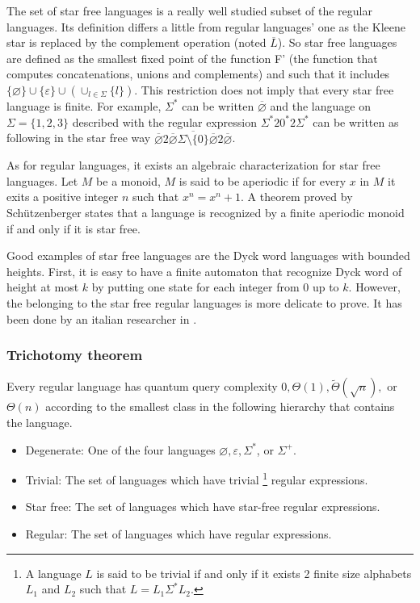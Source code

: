 The set of star free languages is a really well studied subset of the regular languages.
Its definition differs a little from regular languages' one as the Kleene star is replaced
by the complement operation (noted $\overline{L}$). So star free languages are defined
as the smallest fixed point of the function F' (the function that computes concatenations, unions
and complements) and such that it includes
$\{\varnothing\} \cup \{\varepsilon\} \cup(\cup_{l\in\Sigma}\{l\})$.
This restriction does not imply that every star free language is finite.
For example, $\Sigma^*$ can be written $\overline{\varnothing}$ and the
language on $\Sigma = \{1, 2, 3\}$ described with the regular expression
$\Sigma^*20^*2\Sigma^*$ can be written as following in the star free way
$\overline{\varnothing}2\overline{\overline{\varnothing}\Sigma{\setminus}
        \{0\}\overline{\varnothing}}2\overline{\varnothing}$.

As for regular languages, it exists an algebraic characterization for star free
languages. Let $M$ be a monoid, $M$ is said to be aperiodic if for every $x$ in
$M$ it exits a positive integer $n$ such that $x^n=x^n+1$. A theorem proved by
Schützenberger \cite{Schtzenberger1965OnFM} states that a language is recognized
by a finite aperiodic monoid if and only if it is star free.

Good examples of star free languages are the Dyck word languages with bounded
heights. First, it is easy to have a finite automaton that recognize Dyck word
of height at most $k$ by putting one state for each integer from 0 up to $k$.
However, the belonging to the star free regular languages is more delicate to
prove. It has been done by an italian researcher in
\cite[1978]{dyck_height_bound_star_free}.

\subsubsection{Trichotomy theorem}

\begin{theorem}
    Every regular language has quantum query complexity
    \(0,\Theta(1), \tilde{\Theta}(\sqrt{n}),\) or \(\Theta(n) \)
    according to the smallest class in the following hierarchy that contains
    the language.
    \begin{itemize}
        \item Degenerate: One of the four languages \(\varnothing, \varepsilon, \Sigma^*\), or \(\Sigma^+\).
        \item Trivial: The set of languages which have trivial
              \footnote{A language $L$ is said to be trivial if and only if it exists 2 finite size alphabets
                  $L_1$ and $L_2$ such that $L = L_1 \Sigma^* L_2$.}
              regular expressions.
        \item Star free: The set of languages which have star-free regular expressions.
        \item Regular: The set of languages which have regular expressions.
    \end{itemize}
\end{theorem}

